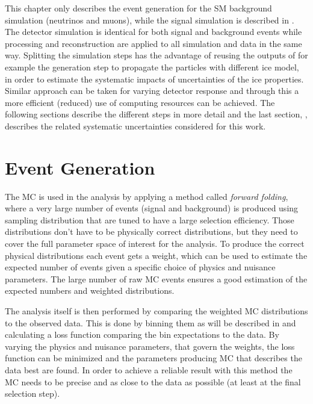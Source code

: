 This chapter only describes the event generation for the SM background simulation (neutrinos and muons), while the signal simulation is described in . The detector simulation is identical for both signal and background events while processing and reconstruction are applied to all simulation and data in the same way. Splitting the simulation steps has the advantage of reusing the outputs of for example the generation step to propagate the particles with different ice model, in order to estimate the systematic impacts of uncertainties of the ice properties. Similar approach can be taken for varying detector response and through this a more efficient (reduced) use of computing resources can be achieved. The following sections describe the different steps in more detail and the last section, , describes the related systematic uncertainties considered for this work.


\section{Event Generation}


The MC is used in the analysis by applying a method called \textit{forward folding}, where a very large number of events (signal and background) is produced using sampling distribution that are tuned to have a large selection efficiency. Those distributions don't have to be physically correct distributions, but they need to cover the full parameter space of interest for the analysis. To produce the correct physical distributions each event gets a weight, which can be used to estimate the expected number of events given a specific choice of physics and nuisance parameters. The large number of raw MC events ensures a good estimation of the expected numbers and weighted distributions. 

The analysis itself is then performed by comparing the weighted MC distributions to the observed data. This is done by binning them as will be described in  and calculating a loss function comparing the bin expectations to the data. By varying the physics and nuisance parameters, that govern the weights, the loss function can be minimized and the parameters producing MC that describes the data best are found. In order to achieve a reliable result with this method the MC needs to be precise and as close to the data as possible (at least at the final selection step). 


